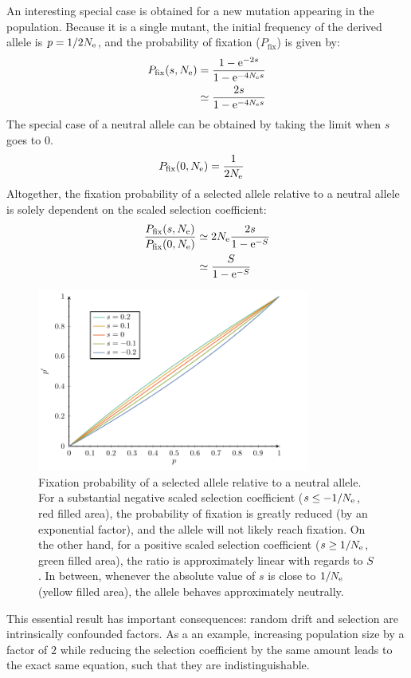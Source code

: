 An interesting special case is obtained for a new mutation appearing in the population.
Because it is a single mutant, the initial frequency of the derived \gls{allele} is $p = 1 / 2 N_{\textrm{e}}$, and the probability of fixation ($P_{\mathrm{fix}}$) is given by:
\begin{align}
    P_{\mathrm{fix}}(s, N_{\textrm{e}}) & = \dfrac{1 - \mathrm{e}^{-2 s}}{1 - \mathrm{e}^{-4 N_{\textrm{e}} s}} \\
    & \simeq  \dfrac{2 s }{1 - \mathrm{e}^{-4 N_{\textrm{e}} s}}
\end{align}
The special case of a \gls{neutral} \gls{allele} can be obtained by taking the limit when $s$ goes to $0$.
\begin{align}
    P_{\mathrm{fix}}(0, N_{\textrm{e}}) & = \dfrac{1}{2 N_{\textrm{e}}}
\end{align}
Altogether, the fixation probability of a selected \gls{allele} relative to a \gls{neutral} \gls{allele} is solely dependent on the scaled selection coefficient:
\begin{align}
    \dfrac{P_{\mathrm{fix}}(s, N_{\textrm{e}})}{P_{\mathrm{fix}}(0, N_{\textrm{e}})} & \simeq 2 N_{\textrm{e}} \dfrac{2s}{1 - \mathrm{e}^{-S}} \\
    & \simeq  \dfrac{S}{1 - \mathrm{e}^{-S}} \label{eq:p-fix}
\end{align}
\begin{figure}[H]
    \centering
    \includegraphics[width=0.8\textwidth, page=2] {figures.pdf}
    \caption[Relative fixation probability]{Fixation probability of a selected {allele} relative to a {neutral} {allele}.
    For a substantial negative scaled selection coefficient ($s \leq -1/N_{\textrm{e}}$, red filled area), the probability of fixation is greatly reduced (by an exponential factor), and the \gls{allele} will not likely reach fixation. On the other hand, for a positive scaled selection coefficient ($s \geq 1 / N_{\textrm{e}}$, green filled area), the ratio is approximately linear with regards to $S$. In between, whenever the absolute value of $s$ is close to $1 / N_{\textrm{e}}$ (yellow filled area), the \gls{allele} behaves approximately neutrally.}
\end{figure}
This essential result has important consequences: random \gls{drift} and selection are intrinsically confounded factors.
As a an example, increasing population size by a factor of $2$ while reducing the selection coefficient by the same amount leads to the exact same equation, such that they are indistinguishable.

